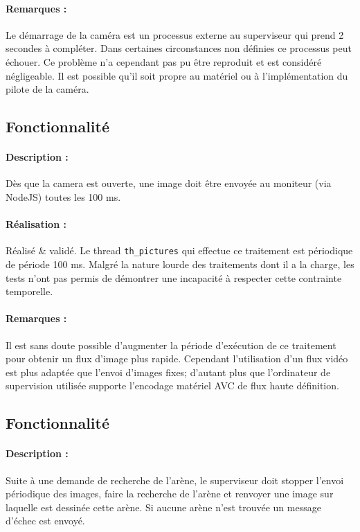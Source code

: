 \documentclass[11pt, a4paper]{paper}
\newcounter{cptreq}
\begin{document}
\paragraph{\color{black}Remarques :} {\color{black} Le démarrage de la caméra est un processus externe au superviseur qui prend 2 secondes à compléter. Dans certaines circonstances non définies ce processus peut échouer. Ce problème n'a cependant pas pu être reproduit et est considéré négligeable. Il est possible qu'il soit propre au matériel ou à l'implémentation du pilote de la caméra. }

\subsection{Fonctionnalité \thecptreq}

\paragraph{Description :} Dès que la camera est ouverte, une image doit être envoyée au moniteur (via NodeJS) toutes les 100 ms.

\paragraph{\color{black}Réalisation :} {\color{black} Réalisé \& validé. Le thread {\tt th\_pictures} qui effectue ce traitement est périodique de période 100 ms. Malgré la nature lourde des traitements dont il a la charge, les tests n'ont pas permis de démontrer une incapacité à respecter cette contrainte temporelle.}

\paragraph{\color{black}Remarques :} {\color{black} Il est sans doute possible d'augmenter la période d'exécution de ce traitement pour obtenir un flux d'image plus rapide. Cependant l'utilisation d'un flux vidéo est plus adaptée que l'envoi d'images fixes; d'autant plus que l'ordinateur de supervision utilisée supporte l'encodage matériel AVC de flux haute définition.}

\subsection{Fonctionnalité \thecptreq}

\paragraph{Description :} Suite à une demande de recherche de l'arène, le superviseur doit stopper l'envoi périodique des images, faire la recherche de l'arène et renvoyer une image sur laquelle est dessinée cette arène. Si aucune arène n'est trouvée un message d'échec est envoyé.\\
\end{document}
